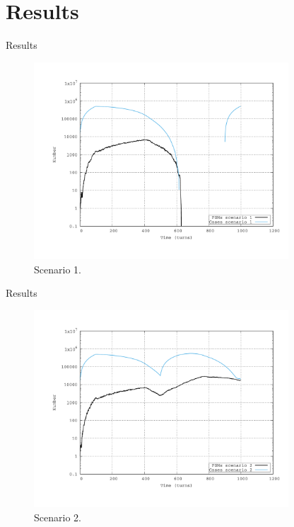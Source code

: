 \documentclass{beamer}
\begin{document}
\section{Results}

\begin{frame}{Results}
\begin{figure}
\centering
\includegraphics[width=0.85\textwidth]{figures/April23_plot1.pdf}
\caption{\label{fig:fsm} Scenario 1.}
\end{figure}
\end{frame}

\begin{frame}{Results}
\begin{figure}
\centering
\includegraphics[width=0.85\textwidth]{figures/April23_plot2.pdf}
\caption{\label{fig:fsm2} Scenario 2.}
\end{figure}
\end{frame}
\end{document}
